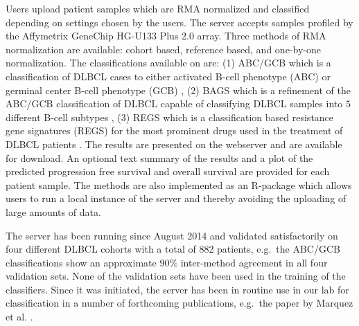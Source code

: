 Users upload patient samples which are RMA normalized and classified depending on settings chosen by the users.
The server accepts samples profiled by the Affymetrix GeneChip HG-U133 Plus 2.0 array.
Three methods of RMA normalization are available: cohort based, reference based, and one-by-one normalization.
The classifications available on \hemaClass{} are:
(1) ABC/GCB which is a classification of DLBCL cases to either activated B-cell phenotype (ABC) or germinal center B-cell phenotype (GCB) \cite{Alizadeh2000},
(2) BAGS which is a refinement of the ABC/GCB classification of DLBCL capable of classifying DLBCL samples into $5$ different B-cell subtypes \cite{DybkaerBoegsted2015},
(3) REGS which is a classification based resistance gene signatures (REGS) for the most prominent drugs used in the treatment of DLBCL patients \cite{Falgreen2015}.
The results are presented on the webserver and are available for download.
An optional text summary of the results and a plot of the predicted progression free survival and overall survival are provided for each patient sample.
The methods are also implemented as an \textsf{R}-package which allows users to run a local instance of the server and thereby avoiding the uploading of large amounts of data.

The server has been running since August 2014 and validated satisfactorily on four different DLBCL cohorts with a total of 882 patients, e.g.\ the ABC/GCB classifications show an approximate $90 \%$ inter-method agreement in all four validation sets.
None of the validation sets have been used in the training of the classifiers.
Since it was initiated, the server has been in routine use in our lab for classification in a number of forthcoming publications, e.g.\ the paper by Marquez et al. \cite{Marquez2015}.

\begingroup
\renewcommand{\section}[2]{}%

\small

\endgroup



